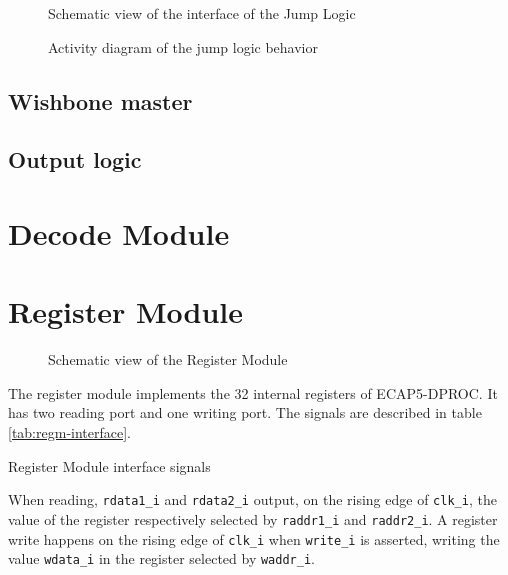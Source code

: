 \begin{figure}[H]
    \centering
    
    \caption{Schematic view of the interface of the Jump Logic}
    \label{fig:jump-logic}
\end{figure}



\begin{figure}[H]
    \centering
    
    \caption{Activity diagram of the jump logic behavior}
    \label{fig:jump-logic-behavior}
\end{figure}

\subsection{Wishbone master}

\subsection{Output logic}

\newpage
\section{Decode Module}
\newpage

\section{Register Module}

\begin{figure}[h!]
    \centering
    
    \caption{Schematic view of the Register Module}
    \label{fig:regm}
\end{figure}

\begin{content}
The register module implements the 32 internal registers of ECAP5-DPROC. It has two reading port and one writing port. The signals are described in table \ref{tab:regm-interface}. 
\end{content}

\begin{table}[H]
  \centering
  
  \caption{Register Module interface signals}
  \label{tab:regm-interface}
\end{table}

\begin{content}
  When reading, \texttt{rdata1\_i} and \texttt{rdata2\_i} output, on the rising edge of \texttt{clk\_i}, the value of the register respectively selected by \texttt{raddr1\_i} and \texttt{raddr2\_i}. A register write happens on the rising edge of \texttt{clk\_i} when \texttt{write\_i} is asserted, writing the value \texttt{wdata\_i} in the register selected by \texttt{waddr\_i}.
\end{content}

